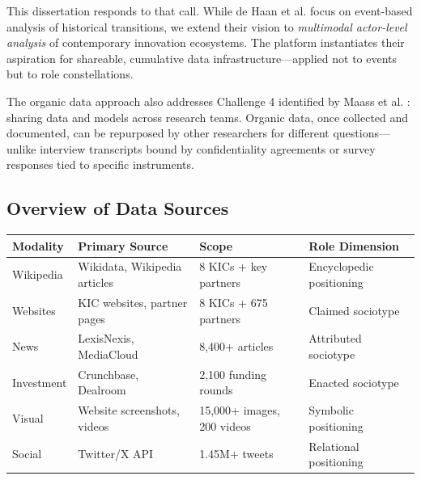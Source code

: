 \documentclass[../main.tex]{subfiles}
\begin{document}
This dissertation responds to that call. While de Haan et al. focus on event-based analysis of historical transitions, we extend their vision to \emph{multimodal actor-level analysis} of contemporary innovation ecosystems. The \RoleBox{} platform instantiates their aspiration for shareable, cumulative data infrastructure---applied not to events but to role constellations.

The organic data approach also addresses Challenge 4 identified by Maass et al. \citeyear{maass2018data}: sharing data and models across research teams. Organic data, once collected and documented, can be repurposed by other researchers for different questions---unlike interview transcripts bound by confidentiality agreements or survey responses tied to specific instruments.

\subsection{Overview of Data Sources}

\tableminimal
\begin{center}
\begin{tabular}{@{}p{2cm}p{3.5cm}p{2.5cm}p{2.5cm}@{}}
\toprule
\textbf{Modality} & \textbf{Primary Source} & \textbf{Scope} & \textbf{Role Dimension} \\
\midrule
Wikipedia & Wikidata, Wikipedia articles & 8 KICs + key partners & Encyclopedic positioning \\
Websites & KIC websites, partner pages & 8 KICs + 675 partners & Claimed sociotype \\
News & LexisNexis, MediaCloud & 8,400+ articles & Attributed sociotype \\
Investment & Crunchbase, Dealroom & 2,100 funding rounds & Enacted sociotype \\
Visual & Website screenshots, videos & 15,000+ images, 200 videos & Symbolic positioning \\
Social & Twitter/X API & 1.45M+ tweets & Relational positioning \\
\bottomrule
\end{tabular}
\end{center}
\end{document}
